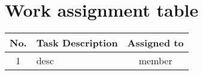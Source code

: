 \section{Work assignment table}
\begin{center}
  \renewcommand{\arraystretch}{1.5}
  \begin{tabular}{|c|p{}|c|}
    \hline
    \textbf{No.} & \textbf{Task Description} & \textbf{Assigned to} \\\hline
    1            & desc                      & member               \\\hline
  \end{tabular}
\end{center}
